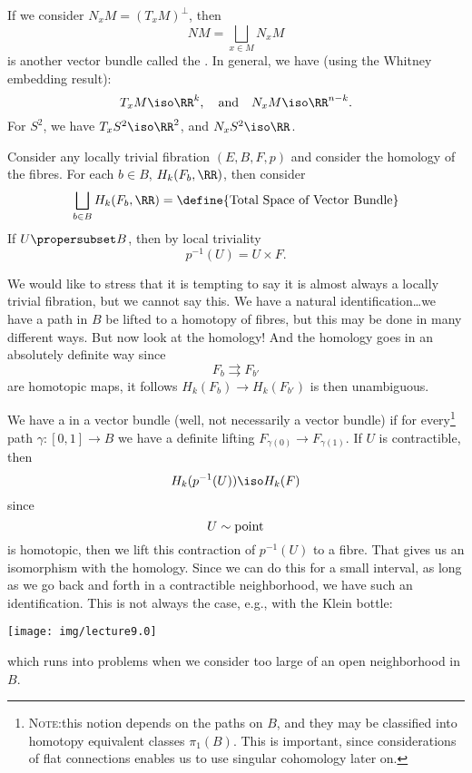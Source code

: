 \begin{ex}
If we consider $N_{x}M=(T_{x}M)^{\bot}$, then 
\begin{equation}
NM=\bigsqcup_{x\in M}N_{x}M
\end{equation}
is another vector bundle called the . In general, we
have (using the Whitney embedding result):
\begin{equation}
T_{x}M\iso\RR^{k},\quad\mbox{and}\quad
N_{x}M\iso\RR^{n-k}.
\end{equation}
For
$S^{2}$, we have $T_{x}S^{2}\iso\RR^{2}$, and $N_{x}S^{2}\iso\RR$.
\end{ex}

Consider any locally trivial fibration $(E,B,F,p)$ and consider
the homology of the fibres. For each $b\in B$,
$H_{k}(F_{b},\RR)$, then consider
\begin{equation}
\bigsqcup_{b\in B}H_{k}(F_{b},\RR)=\mbox{\define{Total Space of Vector Bundle}}
\end{equation}
If $U\propersubset B$, then by local triviality
\begin{equation}
p^{-1}(U)=U\times F.
\end{equation}

We would like to stress that it is tempting to say it is almost
always a locally trivial fibration, but we cannot say this. We
have a natural identification\dots we have a path in $B$ be
lifted to a homotopy of fibres, but this may be done in many
different ways. But now look at the homology! And the homology
goes in an absolutely definite way since
\begin{equation}
F_{b}\rightrightarrows F_{b'}
\end{equation}
are homotopic maps, it follows $H_{k}(F_{b})\to H_{k}(F_{b'})$ is
then unambiguous.

We have a  in a vector bundle (well, not
necessarily a vector bundle) if for every\footnote{\textsc{Note:\quad}\ignorespaces this notion
depends on the paths on $B$, and they may be classified into homotopy equivalent
classes $\pi_{1}(B)$. This is important, since considerations of flat connections enables us to use singular cohomology later on.} path $\gamma\colon[0,1]\to B$ we have a
definite lifting $F_{\gamma(0)}\to F_{\gamma(1)}$. 
If $U$ is contractible, then
\begin{equation}
H_{k}(p^{-1}(U))\iso H_{k}(F)
\end{equation}
since
\begin{equation}
U\sim\mathrm{point}
\end{equation}
is homotopic, then we lift this contraction of $p^{-1}(U)$ to a
fibre. That gives us an isomorphism with the homology. Since we
can do this for a small interval, as long as we go back and forth
in a contractible neighborhood, we have such an
identification. This is not always the case, e.g., with the Klein
bottle:
\begin{center}
\texttt{[image: img/lecture9.0]}
\end{center}
which runs into problems when we consider too large of an open
neighborhood in $B$.

